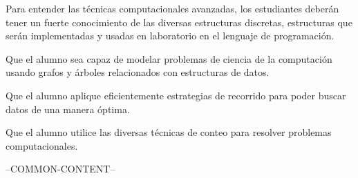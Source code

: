 \begin{syllabus}


\begin{justification}
Para entender las técnicas computacionales avanzadas, los estudiantes deberán tener un fuerte conocimiento de las
diversas estructuras discretas, estructuras que serán implementadas y usadas en laboratorio en el lenguaje de programación.
\end{justification}

\begin{goals}
\item Que el alumno sea capaz de modelar problemas de ciencia de la computación usando grafos y árboles relacionados con estructuras de datos.
\item Que el alumno aplique eficientemente estrategias de recorrido para poder buscar datos de una manera óptima.
\item Que el alumno utilice las diversas técnicas de conteo para resolver problemas computacionales.
\end{goals}

--COMMON-CONTENT--


\end{syllabus}
